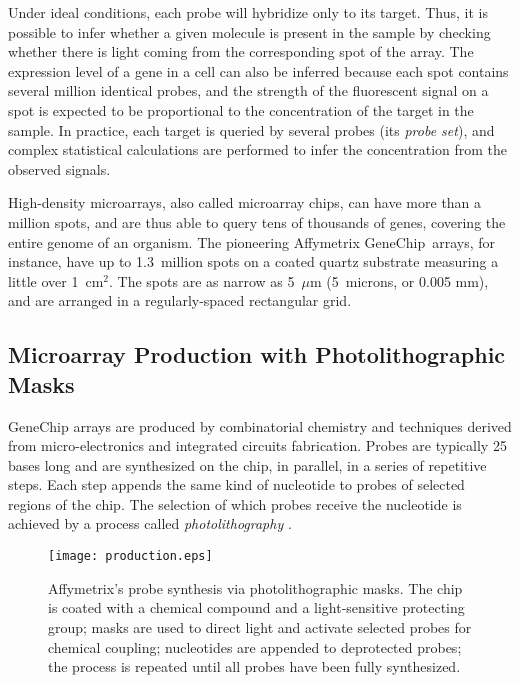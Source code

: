 Under ideal conditions, each probe will hybridize only to its target.  Thus,
it is possible to infer whether a given molecule is present in the sample by
checking whether there is light coming from the corresponding spot of the
array.  The expression level of a gene in a cell can also be inferred because
each spot contains several million identical probes, and the strength of the
fluorescent signal on a spot is expected to be proportional to the
concentration of the target in the sample. In practice, each target is queried
by several probes (its \emph{probe set}), and complex statistical calculations
are performed to infer the concentration from the observed signals.

High-density microarrays, also called microarray chips, can have more than a
million spots, and are thus able to query tens of thousands of genes, covering
the entire genome of an organism.  The pioneering Affymetrix GeneChip\textR\ 
arrays, for instance, have up to 1.3~million spots on a coated quartz
substrate measuring a little over 1~cm$^2$.  The spots are as narrow as
5~$\mu$m (5~microns, or 0.005 mm), and are arranged in a regularly-spaced
rectangular grid.

\subsection{Microarray Production with Photolithographic Masks}

GeneChip arrays are produced by combinatorial chemistry and techniques derived
from micro-electronics and integrated circuits fabrication. Probes are typically
25 bases long and are synthesized on the chip, in parallel, in a series of
repetitive steps. Each step appends the same kind of nucleotide to probes of
selected
regions of the chip. The selection of which probes receive the nucleotide is
achieved by a process called \emph{photolithography} \citep{Fodor1991}.

\begin{figure}\centering
\texttt{[image: production.eps]}
\caption{Affymetrix's probe synthesis via photolithographic masks. The chip is
  coated with a chemical compound and a light-sensitive protecting group;
  masks are used to direct light and activate selected probes for chemical
  coupling; nucleotides are appended to deprotected probes; the process is
  repeated until all probes have been fully synthesized.}
\label{fig:photolithography}
\end{figure}

